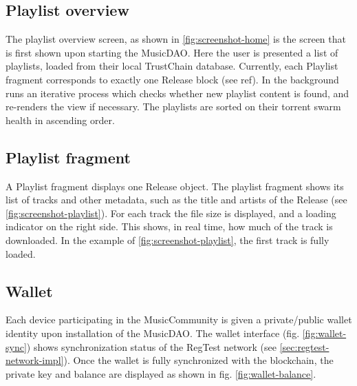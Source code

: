 \subsection{Playlist overview}
The playlist overview screen, as shown in \ref{fig:screenshot-home} is the screen that is first shown upon starting the MusicDAO. Here the user is presented a list of playlists, loaded from their local TrustChain database. Currently, each Playlist fragment corresponds to exactly one Release block (see ref). In the background runs an iterative process which checks whether new playlist content is found, and re-renders the view if necessary. The playlists are sorted on their torrent swarm health in ascending order. 
\subsection{Playlist fragment}
A Playlist fragment displays one Release object. The playlist fragment shows its list of tracks and other metadata, such as the title and artists of the Release (see \ref{fig:screenshot-playlist}). For each track the file size is displayed, and a loading indicator on the right side. This shows, in real time, how much of the track is downloaded. In the example of \ref{fig:screenshot-playlist}, the first track is fully loaded.
\subsection{Wallet}
Each device participating in the MusicCommunity is given a private/public wallet identity upon installation of the MusicDAO. The wallet interface (fig. \ref{fig:wallet-sync}) shows synchronization status of the RegTest network (see \ref{sec:regtest-network-impl}). Once the wallet is fully synchronized with the blockchain, the private key and balance are displayed as shown in fig. \ref{fig:wallet-balance}. 

